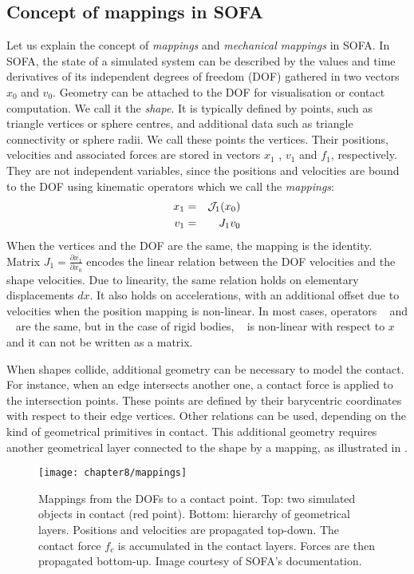 	\subsection{Concept of mappings in SOFA}	\label{chap8:mappings}
Let us explain the concept of \emph{mappings} and \emph{mechanical mappings} in SOFA. In SOFA, the state of a simulated system can be described by the values and time derivatives of its independent degrees of freedom (DOF) gathered in two vectors $x_0$ and $v_0$. Geometry can be attached to the DOF for visualisation or contact computation. We call it the \emph{shape}. It is typically defined by points, such as triangle vertices or sphere centres, and additional data such as triangle connectivity or sphere radii. We call these points the vertices. Their positions, velocities and associated forces are stored in vectors $x_1$ , $v_1$ and $f_1$, respectively. They are not independent variables, since the positions and velocities are bound to the DOF using kinematic operators which we call the \emph{mappings}:
\begin{eqnarray*}
x_1 &=&\mathcal{J}_1(x_0)\\ 
v_1 &=& J_1 v_0
\end{eqnarray*}
When the vertices and the DOF are the same, the mapping is the identity. Matrix $J_1 = \frac{\partial x_1}{\partial x_0}$ encodes the linear relation between the DOF velocities and the shape velocities. Due to linearity, the same relation holds on elementary displacements $dx$. It also holds on accelerations, with an additional offset due to velocities when the position mapping \JNL is non-linear. In most cases, operators \JNL~ and \J~ are the same, but in the case of rigid bodies, \JNL~ is non-linear with respect to $x$ and it can not be written as a matrix.

When shapes collide, additional geometry can be necessary to model the contact. For instance, when an edge intersects another one, a contact force is applied to the intersection points. These points are defined by their barycentric coordinates with respect to their edge vertices. Other relations can be used, depending on the kind of geometrical primitives in contact. This additional geometry requires another geometrical layer connected to the shape by a mapping, as illustrated in .

\begin{figure}[ht]
	\begin{center}
 		\texttt{[image: chapter8/mappings]}
 	\end{center}
 \caption[Concept of mappings in SOFA]{Mappings from the DOFs to a contact point. Top: two simulated objects in contact (red point). Bottom: hierarchy of geometrical layers. Positions and velocities are propagated top-down. The contact force $f_c$ is accumulated in the contact layers. Forces are then propagated bottom-up. Image courtesy of SOFA's documentation. }
\label{chap8:fig-mappings}
\end{figure}

